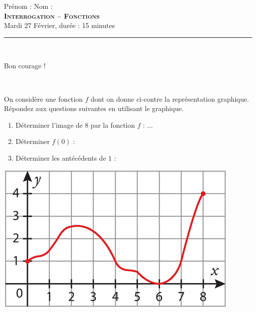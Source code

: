 \documentclass[11pt]{article}
\begin{document}
%
%

\begin{center}
  Prénom : \hfill Nom :\hfill~\\[1cm]
\textbf{\LARGE \textsc{Interrogation -- Fonctions}}\\[2mm]

{\large Mardi 27 Février, durée : 15 minutes}\\[1mm]
\noindent\rule{12cm}{0.4pt}\\[1mm]
\end{center}

\begin{center}
  Bon courage !
\end{center}

\begin{exo}~\\%
  \begin{minipage}[]{.5\textwidth}
    On considère une fonction $f$ dont on donne ci-contre la représentation
    graphique. Répondez aux questions suivantes en utilisant le graphique.
    \begin{enumerate}
      \item Déterminer l'image de $8$ par la fonction $f$ : $\ldots$
      \item Déterminer $f(0)$ :\dotfill
      \item Déterminer les antécédents de $1$ :\dotfill
    \end{enumerate}
  \end{minipage}
  \begin{minipage}[]{.5\textwidth}
    \begin{center}
      \includegraphics[scale=.5]{graphe.png}
    \end{center}
  \end{minipage}
\end{exo}
\end{document}
